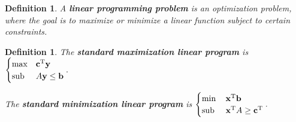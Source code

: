 \documentclass{article}
\theoremstyle{colontheorem}
\newtheorem{definition}[theorem]{Definition}
\newcommand{\T}{^\textnormal{T}}
\newcommand{\Sub}{\textnormal{sub }}
\newenvironment{Def}
{
	\begin{mdframed}[backgroundcolor=DefGreen!10]
	\begin{definition}
}
{
	\end{definition}
	\end{mdframed}
	
	\vspace{.15in}
}
\begin{document}
\begin{Def}
	
	A \textbf{linear programming problem} is an optimization problem, where the goal is to maximize or minimize a linear function subject to certain constraints.
	
\end{Def}



\begin{Def}
	
	The \textbf{standard maximization linear program} is $
	\begin{cases}
	\max & \mathbf{c}\T \mathbf{y}\\
	\Sub & A \mathbf{y} \leq \mathbf{b}
	\end{cases}.
	$
	
	The \textbf{standard minimization linear program} is $
	\begin{cases}
	\min & \mathbf{x}\T \mathbf{b}\\
	\Sub & \mathbf{x}\T A \geq \mathbf{c}\T
	\end{cases}.
	$
	
\end{Def}
\end{document}
